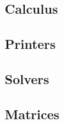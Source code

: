 \subsection{Calculus}
\label{sec:calculus}


\subsection{Printers}



\subsection{Solvers}


\subsection{Matrices}


